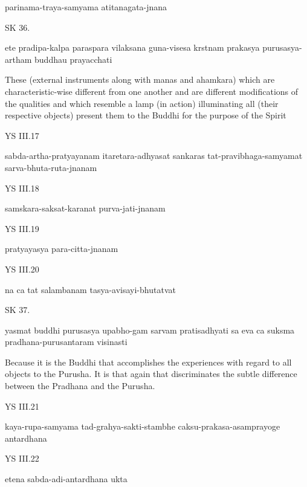     parinama-traya-samyama atitanagata-jnana


SK 36.

ete pradipa-kalpa paraspara vilaksana guna-visesa
krstnam prakasya purusasya-artham buddhau prayacchati

These (external instruments along with manas and ahamkara)
which are characteristic-wise different from one another
and are different modifications of the qualities
and which resemble a lamp (in action)
illuminating all (their respective objects)
present them to the Buddhi for the purpose of the Spirit

YS III.17

    sabda-artha-pratyayanam itaretara-adhyasat sankaras
    tat-pravibhaga-samyamat sarva-bhuta-ruta-jnanam

YS III.18

    samskara-saksat-karanat purva-jati-jnanam

YS III.19

    pratyayasya para-citta-jnanam

YS III.20

    na ca tat salambanam tasya-avisayi-bhutatvat


SK 37.

yasmat buddhi purusasya upabho-gam sarvam pratisadhyati
sa eva ca suksma pradhana-purusantaram visinasti

Because it is the Buddhi that accomplishes the experiences
with regard to all objects to the Purusha.
It is that again that discriminates the subtle difference
between the Pradhana and the Purusha.

YS III.21

    kaya-rupa-samyama tad-grahya-sakti-stambhe
    caksu-prakasa-asamprayoge antardhana

YS III.22

    etena sabda-adi-antardhana ukta
